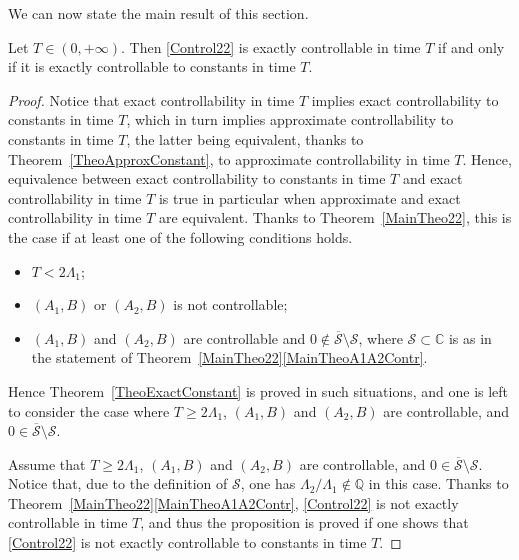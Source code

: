 We can now state the main result of this section.

\begin{theo}
\label{TheoExactConstant}
Let $T \in (0, +\infty)$. Then \eqref{Control22} is exactly controllable in time $T$ if and only if it is exactly controllable to constants in time $T$.
\end{theo}

\begin{proof}
Notice that exact controllability in time $T$ implies exact controllability to constants in time $T$, which in turn implies approximate controllability to constants in time $T$, the latter being equivalent, thanks to Theorem~\ref{TheoApproxConstant}, to approximate controllability in time $T$. Hence, equivalence between exact controllability to constants in time $T$ and exact controllability in time $T$ is true in particular when approximate and exact controllability in time $T$ are equivalent. Thanks to Theorem~\ref{MainTheo22}, this is the case if at least one of the following conditions holds.
\begin{itemize}
\item $T < 2 \Lambda_1$;
\item $(A_1, B)$ or $(A_2, B)$ is not controllable;
\item $(A_1, B)$ and $(A_2, B)$ are controllable and $0 \notin \overline{\mathcal S} \setminus \mathcal S$, where $\mathcal S \subset \mathbb C$ is as in the statement of Theorem~\ref{MainTheo22}\eqref{MainTheoA1A2Contr}.
\end{itemize}
Hence Theorem~\ref{TheoExactConstant} is proved in such situations, and one is left to consider the case where $T \geq 2 \Lambda_1$, $(A_1, B)$ and $(A_2, B)$ are controllable, and $0 \in \overline{\mathcal S} \setminus \mathcal S$.

Assume that $T \geq 2 \Lambda_1$, $(A_1, B)$ and $(A_2, B)$ are controllable, and $0 \in \overline{\mathcal S} \setminus \mathcal S$. Notice that, due to the definition of $\mathcal S$, one has $\Lambda_2 / \Lambda_1 \notin \mathbb Q$ in this case. Thanks to Theorem~\ref{MainTheo22}\eqref{MainTheoA1A2Contr}, \eqref{Control22} is not exactly controllable in time $T$, and thus the proposition is proved if one shows that \eqref{Control22} is not exactly controllable to constants in time $T$.


\end{proof}
